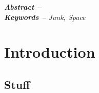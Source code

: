 \documentclass[a4paper,10pt,twocolumn]{article}
\begin{document}
\textit{\textbf{Abstract -- }}\lipsum[1]
\\[0.5cm]
\textit{\textbf{Keywords --} Junk, Space}


\section{Introduction}
\lipsum\cite{lunduke_half_2018}
\subsection{Stuff}
\lipsum

\printbibliography
\end{document}
